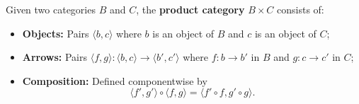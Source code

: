 Given two categories $B$ and $C$, the \textbf{product category} $B \times C$ consists of:
\begin{itemize}
\item \textbf{Objects:} Pairs $\langle b, c \rangle$ where $b$ is an object of $B$ and $c$ is an object of $C$;
\item \textbf{Arrows:} Pairs $\langle f, g \rangle: \langle b, c \rangle \to \langle b', c' \rangle$ where $f: b \to b'$ in $B$ and $g: c \to c'$ in $C$;
\item \textbf{Composition:} Defined componentwise by
$$\langle f', g' \rangle \circ \langle f, g \rangle = \langle f' \circ f, g' \circ g \rangle.$$
\end{itemize}
